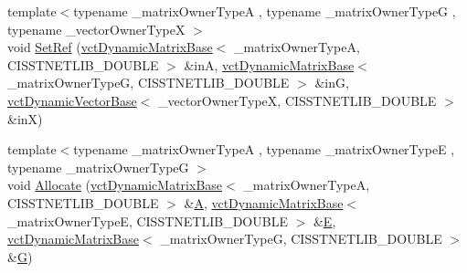 \begin{DoxyCompactItemize}
{\footnotesize template$<$typename \+\_\+matrix\+Owner\+Type\+A , typename \+\_\+matrix\+Owner\+Type\+G , typename \+\_\+vector\+Owner\+Type\+X $>$ }\\void \hyperlink{classnmr_l_sq_lin_solution_dynamic_a1d7e2bc11a4fa74c799179eaf713d907}{Set\+Ref} (\hyperlink{classvct_dynamic_matrix_base}{vct\+Dynamic\+Matrix\+Base}$<$ \+\_\+matrix\+Owner\+Type\+A, C\+I\+S\+S\+T\+N\+E\+T\+L\+I\+B\+\_\+\+D\+O\+U\+B\+L\+E $>$ \&in\+A, \hyperlink{classvct_dynamic_matrix_base}{vct\+Dynamic\+Matrix\+Base}$<$ \+\_\+matrix\+Owner\+Type\+G, C\+I\+S\+S\+T\+N\+E\+T\+L\+I\+B\+\_\+\+D\+O\+U\+B\+L\+E $>$ \&in\+G, \hyperlink{classvct_dynamic_vector_base}{vct\+Dynamic\+Vector\+Base}$<$ \+\_\+vector\+Owner\+Type\+X, C\+I\+S\+S\+T\+N\+E\+T\+L\+I\+B\+\_\+\+D\+O\+U\+B\+L\+E $>$ \&in\+X)
\item 
{\footnotesize template$<$typename \+\_\+matrix\+Owner\+Type\+A , typename \+\_\+matrix\+Owner\+Type\+E , typename \+\_\+matrix\+Owner\+Type\+G $>$ }\\void \hyperlink{classnmr_l_sq_lin_solution_dynamic_a91b81a354d2cc9d11314b0ab079bad59}{Allocate} (\hyperlink{classvct_dynamic_matrix_base}{vct\+Dynamic\+Matrix\+Base}$<$ \+\_\+matrix\+Owner\+Type\+A, C\+I\+S\+S\+T\+N\+E\+T\+L\+I\+B\+\_\+\+D\+O\+U\+B\+L\+E $>$ \&\hyperlink{classnmr_l_sq_lin_solution_dynamic_aa4a41abac141e2e55dd5cafb59169dfd}{A}, \hyperlink{classvct_dynamic_matrix_base}{vct\+Dynamic\+Matrix\+Base}$<$ \+\_\+matrix\+Owner\+Type\+E, C\+I\+S\+S\+T\+N\+E\+T\+L\+I\+B\+\_\+\+D\+O\+U\+B\+L\+E $>$ \&\hyperlink{classnmr_l_sq_lin_solution_dynamic_a7c1ac112b07f3edd33d348fe0a40fb71}{E}, \hyperlink{classvct_dynamic_matrix_base}{vct\+Dynamic\+Matrix\+Base}$<$ \+\_\+matrix\+Owner\+Type\+G, C\+I\+S\+S\+T\+N\+E\+T\+L\+I\+B\+\_\+\+D\+O\+U\+B\+L\+E $>$ \&\hyperlink{classnmr_l_sq_lin_solution_dynamic_a399cb314fb848d36f58c14830bad0c28}{G})
\item 

\end{DoxyCompactItemize}
